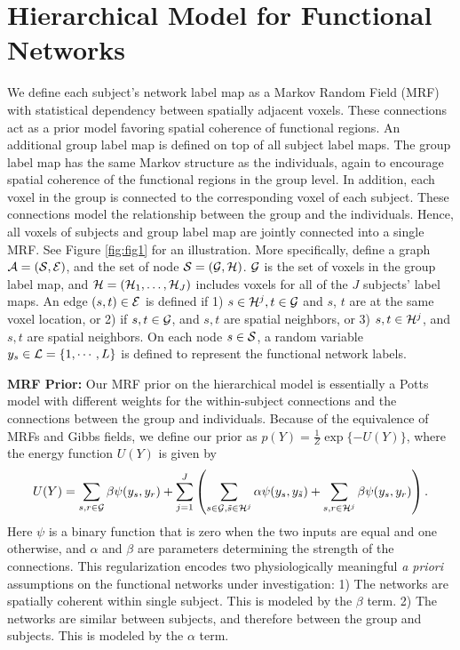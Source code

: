 \documentclass[runningheads,a4paper]{llncs}
\begin{document}
\section{Hierarchical Model for Functional Networks}
\label{sec:model}
We define each subject's network label map as a Markov Random Field (MRF) with
statistical dependency between spatially adjacent voxels. These connections act
as a prior model favoring spatial coherence of functional regions. An additional
group label map is defined on top of all subject label maps. The group label map
has the same Markov structure as the individuals, again to encourage spatial
coherence of the functional regions in the group level. In addition, each voxel
in the group is connected to the corresponding voxel of each subject. These
connections model the relationship between the group and the individuals. Hence,
all voxels of subjects and group label map are jointly connected into a single
MRF. See Figure \ref{fig:fig1} for an illustration. More specifically, define a
graph $\mathcal{A} = (\mathcal{S}, \mathcal{E})$, and the set of node $\mathcal{S} = (\mathcal{G}, \mathcal{H})$. $\mathcal{G}$ is the
set of voxels in the group label map, and $\mathcal{H} = (\mathcal{H}_1, \dots, \mathcal{H}_J)$ includes
voxels for all of the $J$ subjects' label maps. An edge $(s, t) \in \mathcal{E}$ is
defined if 1) $s\in \mathcal{H}^j, t\in \mathcal{G}$ and $s$, $t$ are at the same voxel
location, or 2) if $s, t\in \mathcal{G}$, and $s, t$ are spatial neighbors, or 3) $s,
t\in \mathcal{H}^j$, and $s, t$ are spatial neighbors. On each node $s \in \mathcal{S}$, a
random variable $y_s \in \mathcal{L} = \{1,\cdots, L\}$ is defined to represent the
functional network labels.

\noindent\textbf{MRF Prior: } 
Our MRF prior on the hierarchical model is essentially a Potts model with
different weights for the within-subject connections and the connections between
the group and individuals. Because of the equivalence of MRFs and Gibbs fields,
we define our prior as $p(Y) = \frac{1}{Z}\exp\{ -U(Y)\}$, where the energy
function $U(Y)$ is given by
\begin{equation*}
  U(Y) = \sum_{s,r\in\mathcal{G}} \beta \psi(y_s, y_r) + \sum_{j=1}^J \left ( \sum_{s\in\mathcal{G}, \tilde s\in\mathcal{H}^j} \alpha \psi(y_s, y_{\tilde s}) + \sum_{s,r\in\mathcal{H}^j}\beta\psi(y_s, y_r) \right ).
\end{equation*}
Here $\psi$ is a binary function that is zero when the two inputs are equal and
one otherwise, and $\alpha$ and $\beta$ are parameters determining the strength
of the connections. This regularization encodes two physiologically meaningful
\emph{a priori} assumptions on the functional networks under investigation: 1)
The networks are spatially coherent within single subject. This is modeled by
the $\beta$ term. 2) The networks are similar between subjects, and therefore
between the group and subjects. This is modeled by the $\alpha$ term.  
\end{document}
